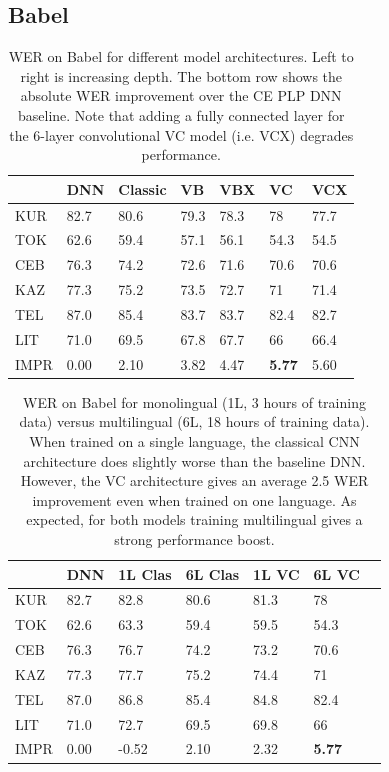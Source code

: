 \documentclass{article}
\begin{document}
\subsection{Babel}
\label{ssec:babel}

\begin{table}[ht]
\centering
\begin{tabular}{l | l | lllll}
         & DNN     & Classic & VB   & VBX  & VC   & VCX  \\ \hline
KUR      & 82.7 & 80.6    & 79.3 & 78.3 & 78   & 77.7 \\
TOK      & 62.6 & 59.4    & 57.1 & 56.1 & 54.3 & 54.5 \\
CEB      & 76.3 & 74.2    & 72.6 & 71.6 & 70.6 & 70.6 \\
KAZ      & 77.3 & 75.2    & 73.5 & 72.7 & 71   & 71.4 \\
TEL      & 87.0 & 85.4    & 83.7 & 83.7 & 82.4 & 82.7 \\
LIT      & 71.0 & 69.5    & 67.8 & 67.7 & 66   & 66.4 \\ \hline
IMPR     & 0.00 & 2.10    & 3.82 & 4.47 & \bf{5.77} & 5.60
\end{tabular}
\caption{\label{tab:depth}WER on Babel for different model architectures. Left to right is increasing depth. 
    The bottom row shows the absolute WER improvement over the CE PLP DNN baseline.
    Note that adding a fully connected layer for the 6-layer convolutional VC model (i.e. VCX) degrades performance.
}
\end{table}

\begin{table}[ht]
\centering
\begin{tabular}{l | l | lllll}
     & DNN  & 1L Clas    & 6L Clas    & 1L VC  & 6L VC  \\ \hline
KUR      & 82.7 & 82.8    & 80.6    & 81.3  & 78    \\
TOK      & 62.6 & 63.3    & 59.4    & 59.5  & 54.3  \\
CEB      & 76.3 & 76.7    & 74.2    & 73.2  & 70.6  \\
KAZ      & 77.3 & 77.7    & 75.2    & 74.4  & 71    \\
TEL      & 87.0 & 86.8    & 85.4    & 84.8  & 82.4  \\
LIT      & 71.0 & 72.7    & 69.5    & 69.8  & 66    \\ \hline
IMPR     & 0.00 & -0.52   & 2.10    & 2.32  & \bf{5.77}
\end{tabular}
\caption{\label{tab:multiling}WER on Babel for monolingual (1L, 3 hours of training data) versus 
    multilingual (6L, 18 hours of training data).
    When trained on a single language, the classical CNN architecture does slightly worse than the baseline DNN.
    However, the VC architecture gives an average 2.5 WER improvement even when trained on one language.
    As expected, for both models training multilingual gives a strong performance boost.}
\end{table}
\end{document}

